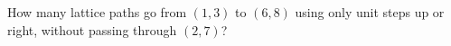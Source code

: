 How many lattice paths go from $(1,3)$ to $(6,8)$ using only unit steps up or right, without passing through $(2,7)$?
